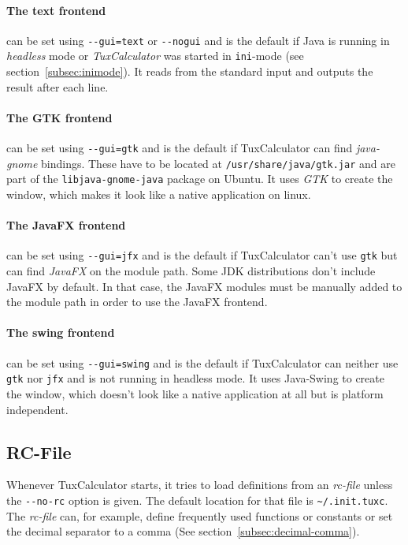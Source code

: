 \documentclass[10pt]{article}
\let\~=\allowbreak
\begin{document}
    \paragraph{The text frontend} can be set using \verb|--gui=text| or \verb|--nogui| and is the default if Java is running in \textsl{headless} mode or \textit{TuxCalculator} was started in \verb|ini|-mode (see section~\ref{subsec:inimode}).
    It reads from the standard input and outputs the result after each line.
    
    \paragraph{The GTK frontend} can be set using \verb|--gui=gtk| and is the default if TuxCalculator can find \textsl{java-gnome} bindings.
    These have to be located at \texttt{/usr\~/share\~/java\~/gtk.jar} and are part of the \texttt{libjava-\~gnome-\~java} package on Ubuntu.
    It uses \textsl{GTK} to create the window, which makes it look like a native application on linux.
    
    \paragraph{The JavaFX frontend} can be set using \verb|--gui=jfx| and is the default if TuxCalculator can't use \verb|gtk| but can find \textsl{JavaFX} on the module path.
    Some JDK distributions don't include JavaFX by default.
    In that case, the JavaFX modules must be manually added to the module path in order to use the JavaFX frontend.
    
    \paragraph{The swing frontend} can be set using \verb|--gui=swing| and is the default if TuxCalculator can neither use \verb|gtk| nor \verb|jfx| and is not running in headless mode.
    It uses Java-Swing to create the window, which doesn't look like a native application at all but is platform independent.
    
    \subsection{RC-File}\label{subsec:rcfile}
    Whenever TuxCalculator starts, it tries to load definitions from an \textit{rc-file} unless the \verb|--no-rc| option is given.
    The default location for that file is \verb|~/.init.tuxc|.
    The \textit{rc-file} can, for example, define frequently used functions or constants or set the decimal separator to a comma (See section~\ref{subsec:decimal-comma}).
\end{document}
